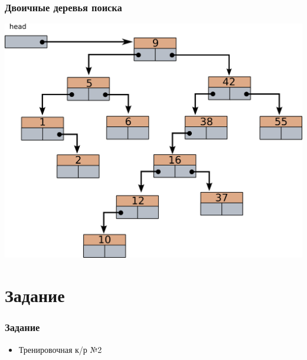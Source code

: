 \documentclass[12pt,pdf,hyperref={unicode}]{beamer}
\begin{document}
\begin{frame}[fragile]
\frametitle{Двоичные деревья поиска}  
\begin{center}
\includegraphics[width=0.75\linewidth]{images/bintree_search_1.png}
\end{center}
\end{frame}




\section{Задание}

\begin{frame}[fragile]
\frametitle{Задание} 
\begin{itemize}
\item Тренировочная к/р №2
\end{itemize}
\end{frame}
\end{document}
